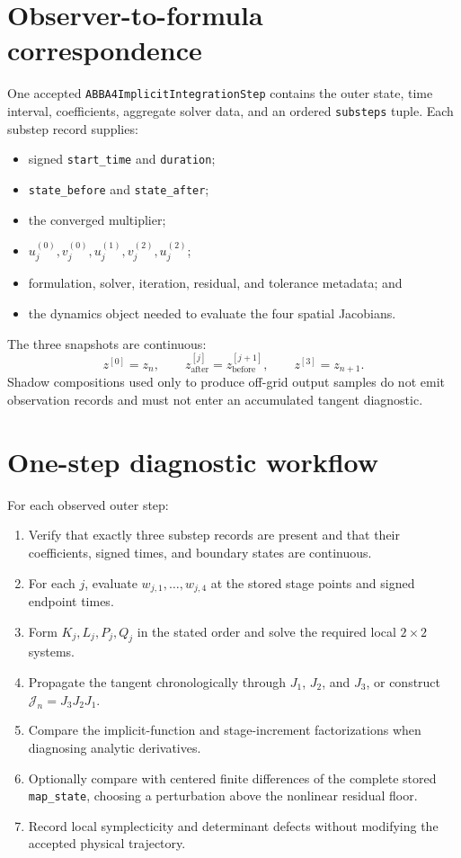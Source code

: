 \documentclass[11pt,a4paper]{article}
\begin{document}
\section{Observer-to-formula correspondence}

One accepted \texttt{ABBA4ImplicitIntegrationStep} contains the outer state,
time interval, coefficients, aggregate solver data, and an ordered
\texttt{substeps} tuple.  Each substep record supplies:
\begin{itemize}
 \item signed \texttt{start\_time} and \texttt{duration};
 \item \texttt{state\_before} and \texttt{state\_after};
 \item the converged multiplier;
 \item $u_j^{(0)},v_j^{(0)},u_j^{(1)},v_j^{(2)},u_j^{(2)}$;
 \item formulation, solver, iteration, residual, and tolerance metadata; and
 \item the dynamics object needed to evaluate the four spatial Jacobians.
\end{itemize}

The three snapshots are continuous:
\[
 z^{[0]}=z_n,
 \qquad
 z^{[j]}_{\mathrm{after}}=z^{[j+1]}_{\mathrm{before}},
 \qquad
 z^{[3]}=z_{n+1}.
\]
Shadow compositions used only to produce off-grid output samples do not emit
observation records and must not enter an accumulated tangent diagnostic.

\section{One-step diagnostic workflow}

For each observed outer step:
\begin{enumerate}
 \item Verify that exactly three substep records are present and that their
       coefficients, signed times, and boundary states are continuous.
 \item For each $j$, evaluate $w_{j,1},\ldots,w_{j,4}$ at the stored stage
       points and signed endpoint times.
 \item Form $K_j,L_j,P_j,Q_j$ in the stated order and solve the required local
       $2\times2$ systems.
 \item Propagate the tangent chronologically through $J_1$, $J_2$, and $J_3$,
       or construct $\mathcal J_n=J_3J_2J_1$.
 \item Compare the implicit-function and stage-increment factorizations when
       diagnosing analytic derivatives.
 \item Optionally compare with centered finite differences of the complete
       stored \texttt{map\_state}, choosing a perturbation above the nonlinear
       residual floor.
 \item Record local symplecticity and determinant defects without modifying the
       accepted physical trajectory.
\end{enumerate}
\end{document}
